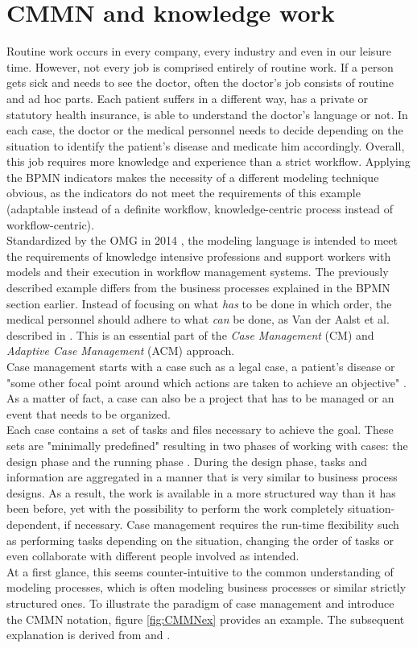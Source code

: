 \section{CMMN and knowledge work}
Routine work occurs in every company, every industry and even in our leisure time. However, not every job is comprised entirely of routine work.
If a person gets sick and needs to see the doctor, often the doctor's job consists of routine and ad hoc parts. Each patient suffers in a different way, has a private or statutory health insurance, is able to understand the doctor's language or not. In each case, the doctor or the medical personnel needs to decide depending on the situation to identify the patient's disease and medicate him accordingly. Overall, this job requires more knowledge and experience than a strict workflow. Applying the BPMN indicators makes the necessity of a different modeling technique obvious, as the indicators do not meet the requirements of this example (adaptable instead of a definite workflow, knowledge-centric process instead of workflow-centric).\\
Standardized by the OMG in 2014 \cite{CMMNspec2014}, the modeling language is intended to meet the requirements of knowledge intensive professions and support workers with models and their execution in workflow management systems. 
The previously described example differs from the business processes explained in the BPMN section earlier. Instead of focusing on what \textit{has} to be done in which order, the medical personnel should adhere to what \textit{can} be done, as Van der Aalst et al. described in \cite{aalst2005}. This is an essential part of the \textit{Case Management} (CM) and \textit{Adaptive Case Management} (ACM) approach.\\
 Case management starts with a case such as a legal case, a patient's disease or "some other focal point around which actions are taken to achieve an objective" \cite{CMMNspec2014}. As a matter of fact, a case can also be a project that has to be managed or an event that needs to be organized. \\
Each case contains a set of tasks and files necessary to achieve the goal. These sets are "minimally predefined" \cite{CMMNspec2014} resulting in two phases of working with cases: the design phase and the running phase \cite{CMMNspec2014}. During the design phase, tasks and information are aggregated in a manner that is very similar to business process designs. As a result, the work is available in a more structured way than it has been before, yet with the possibility to perform the work completely situation-dependent, if necessary. Case management requires the run-time flexibility such as performing tasks depending on the situation, changing the order of tasks or even collaborate with different people involved as intended. \\
At a first glance, this seems counter-intuitive to the common understanding of modeling processes, which is often modeling business processes or similar strictly structured ones. To illustrate the paradigm of case management and introduce the CMMN notation, figure \ref{fig:CMMNex} provides an example. The subsequent explanation is derived from \cite{CMMNspec2014} and \cite{hinkelmann2015}.

